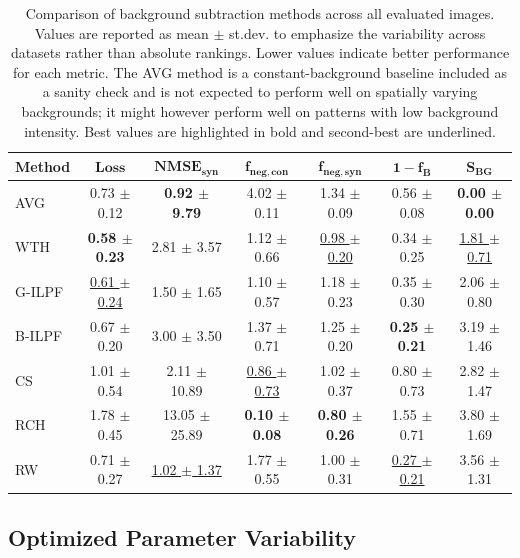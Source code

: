 \documentclass[journal,article,submit,moreauthors]{Definitions/mdpi}
\begin{document}
\begin{table}[h]
\caption{Comparison of background subtraction methods across all evaluated images. Values are reported as mean $\pm$ st.dev. to emphasize the variability across datasets rather than absolute rankings. Lower values indicate better performance for each metric. The AVG method is a constant-background baseline included as a sanity check and is not expected to perform well on spatially varying backgrounds; it might however perform well on patterns with low background intensity. Best values are highlighted in bold and second-best are underlined.}
\label{tab:method_performance_new}
\centering
\small
\setlength{\tabcolsep}{3pt}
\renewcommand{\arraystretch}{1.1}
\begin{tabular}{@{}lcccccc@{}}
\toprule
\textbf{Method} & $\mathbf{Loss}$ & $\mathbf{NMSE}_{\mathbf{syn}}$ & $\mathbf{f}_{\mathbf{neg,con}}$ & $\mathbf{f}_{\mathbf{neg,syn}}$ & $\mathbf{1-f_B}$ & $\mathbf{S}_{\mathbf{BG}}$ \\
\midrule
AVG & 0.73 $\pm$ 0.12 & \textbf{0.92 $\pm$ 9.79} & 4.02 $\pm$ 0.11 & 1.34 $\pm$ 0.09 & 0.56 $\pm$ 0.08 & \textbf{0.00 $\pm$ 0.00} \\
WTH & \textbf{0.58 $\pm$ 0.23} & 2.81 $\pm$ 3.57 & 1.12 $\pm$ 0.66 & \underline{0.98 $\pm$ 0.20} & 0.34 $\pm$ 0.25 & \underline{1.81 $\pm$ 0.71} \\

G-ILPF & \underline{0.61 $\pm$ 0.24} & 1.50 $\pm$ 1.65 & 1.10 $\pm$ 0.57 & 1.18 $\pm$ 0.23 & 0.35 $\pm$ 0.30 & 2.06 $\pm$ 0.80 \\
B-ILPF & 0.67 $\pm$ 0.20 & 3.00 $\pm$ 3.50 & 1.37 $\pm$ 0.71 & 1.25 $\pm$ 0.20 & \textbf{0.25 $\pm$ 0.21} & 3.19 $\pm$ 1.46 \\
CS & 1.01 $\pm$ 0.54 & 2.11 $\pm$ 10.89 & \underline{0.86 $\pm$ 0.73} & 1.02 $\pm$ 0.37 & 0.80 $\pm$ 0.73 & 2.82 $\pm$ 1.47 \\
RCH & 1.78 $\pm$ 0.45 & 13.05 $\pm$ 25.89 & \textbf{0.10 $\pm$ 0.08} & \textbf{0.80 $\pm$ 0.26} & 1.55 $\pm$ 0.71 & 3.80 $\pm$ 1.69 \\
RW & 0.71 $\pm$ 0.27 & \underline{1.02 $\pm$ 1.37} & 1.77 $\pm$ 0.55 & 1.00 $\pm$ 0.31 & \underline{0.27 $\pm$ 0.21}  & 3.56 $\pm$ 1.31  \\

\bottomrule
\end{tabular}
\end{table}

\subsection{Optimized Parameter Variability}
\label{sec:param_variability}
\end{document}
